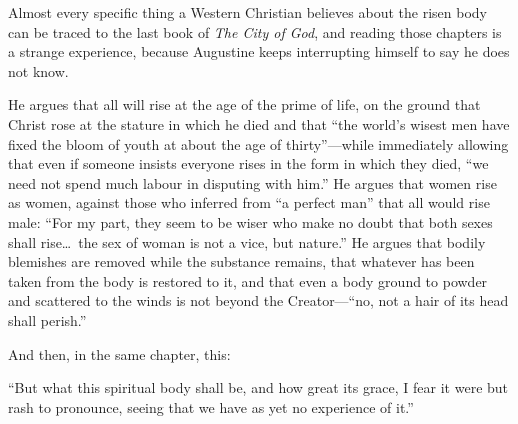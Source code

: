 Almost every specific thing a Western Christian believes about the risen body can be traced to the last book of \emph{The City of God}, and reading those chapters is a strange experience, because Augustine keeps interrupting himself to say he does not know.

He argues that all will rise at the age of the prime of life, on the ground that Christ rose at the stature in which he died and that ``the world's wisest men have fixed the bloom of youth at about the age of thirty''---while immediately allowing that even if someone insists everyone rises in the form in which they died, ``we need not spend much labour in disputing with him.'' He argues that women rise as women, against those who inferred from ``a perfect man'' that all would rise male: ``For my part, they seem to be wiser who make no doubt that both sexes shall rise\ldots\ the sex of woman is not a vice, but nature.'' He argues that bodily blemishes are removed while the substance remains, that whatever has been taken from the body is restored to it, and that even a body ground to powder and scattered to the winds is not beyond the Creator---``no, not a hair of its head shall perish.''

And then, in the same chapter, this:

\begin{studyframe}
``But what this spiritual body shall be, and how great its grace, I fear it were but rash to pronounce, seeing that we have as yet no experience of it.''
\end{studyframe}

